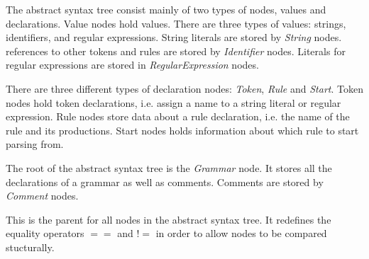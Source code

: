 
The abstract syntax tree consist mainly of two types of nodes, values and declarations. Value nodes hold values. There are three types of values: strings, identifiers, and regular expressions. String literals are stored by \textit{String} nodes. references to other tokens and rules are stored by \textit{Identifier} nodes. Literals for regular expressions are stored in \textit{RegularExpression} nodes.\par
There are three different types of declaration nodes: \textit{Token}, \textit{Rule} and \textit{Start}. Token nodes hold token declarations, i.e. assign a name to a string literal or regular expression. Rule nodes store data about a rule declaration, i.e. the name of the rule and its productions. Start nodes holds information about which rule to start parsing from.


The root of the abstract syntax tree is the \textit{Grammar} node. It stores all the declarations of a grammar as well as comments. Comments are stored by \textit{Comment} nodes.




This is the parent for all nodes in the abstract syntax tree. It redefines the equality operators $==$ and $!=$ in order to allow nodes to be compared stucturally.
